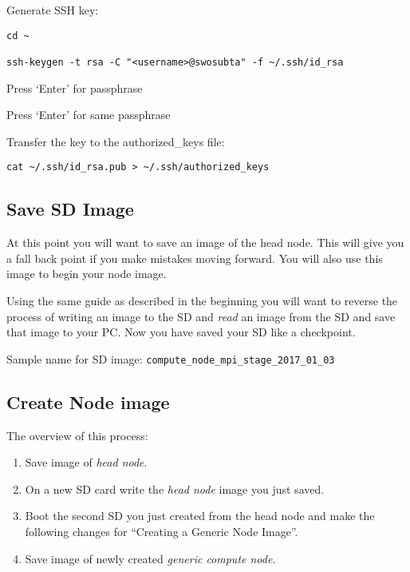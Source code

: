 \documentclass[]{article}
\providecommand{\tightlist}{%
  \setlength{\itemsep}{0pt}\setlength{\parskip}{0pt}}
\begin{document}
Generate SSH key:

\begin{verbatim}
cd ~

ssh-keygen -t rsa -C "<username>@swosubta" -f ~/.ssh/id_rsa
\end{verbatim}

Press `Enter' for passphrase

Press `Enter' for same passphrase

Transfer the key to the authorized\_keys file:

\begin{verbatim}
cat ~/.ssh/id_rsa.pub > ~/.ssh/authorized_keys
\end{verbatim}

\subsection{Save SD Image}\label{save-sd-image}

At this point you will want to save an image of the head node. This will
give you a fall back point if you make mistakes moving forward. You will
also use this image to begin your node image.

Using the same guide as described in the beginning you will want to
reverse the process of writing an image to the SD and \emph{read} an
image from the SD and save that image to your PC. Now you have saved
your SD like a checkpoint.

Sample name for SD image:
\texttt{compute\_node\_mpi\_stage\_2017\_01\_03}

\subsection{Create Node image}\label{create-node-image}

The overview of this process:

\begin{enumerate}
\def\labelenumi{\arabic{enumi}.}
\tightlist
\item
  Save image of \emph{head node}.
\item
  On a new SD card write the \emph{head node} image you just saved.
\item
  Boot the second SD you just created from the head node and make the
  following changes for ``Creating a Generic Node Image''.
\item
  Save image of newly created \emph{generic compute node}.
\end{enumerate}
\end{document}
